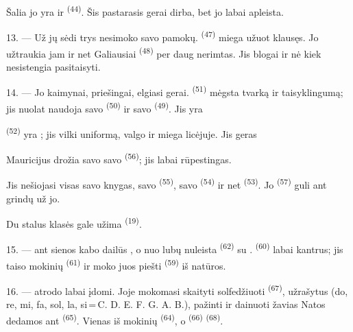Šalia jo yra  ir  \textsuperscript{(44)}. Šis
pastarasis gerai dirba, bet jo  labai apleista.

13. --- Už jų sėdi trys  nesimoko savo pamokų.
 \textsuperscript{(47)} miega užuot klausęs. Jo 
užtraukia jam  ir net  Galiausiai
 \textsuperscript{(48)} per daug nerimtas. Jis blogai
 ir nė kiek nesistengia pasitaisyti.

14. --- Jo kaimynai, priešingai, elgiasi gerai. 
\textsuperscript{(51)} mėgsta tvarką ir taisyklingumą; jis nuolat naudoja savo
 \textsuperscript{(50)} ir savo 
\textsuperscript{(49)}. Jis yra 

 \textsuperscript{(52)} yra ; jis vilki uniformą,
valgo ir miega licėjuje. Jis geras 

Mauricijus drožia savo  savo 
\textsuperscript{(56)}; jis labai rūpestingas.

Jis nešiojasi visas savo knygas, savo  \textsuperscript{(55)}, savo
 \textsuperscript{(54)} ir net 
\textsuperscript{(53)}. Jo  \textsuperscript{(57)} guli ant
grindų už jo.

Du stalus klasės gale užima  \textsuperscript{(19)}.

\VUsaut{4.6mm}
\VUsaut{3.4mm}

15. ---  ant sienos kabo dailūs , o nuo
lubų nuleista  \textsuperscript{(62)} su .
 \textsuperscript{(60)} labai kantrus; jis taiso mokinių
 \textsuperscript{(61)} ir moko juos piešti 
\textsuperscript{(59)} iš natūros.

16. ---  atrodo labai įdomi. Joje mokomasi skaityti
 solfedžiuoti  \textsuperscript{(67)}, užrašytus
 (do, re, mi, fa, sol, la,
si\,=\,C. D. E. F. G. A. B.), pažinti  ir dainuoti žavias
 Natos dedamos ant  \textsuperscript{(65)}. Vienas iš
mokinių  \textsuperscript{(64)}, o 
\textsuperscript{(66)}  \textsuperscript{(68)}.

